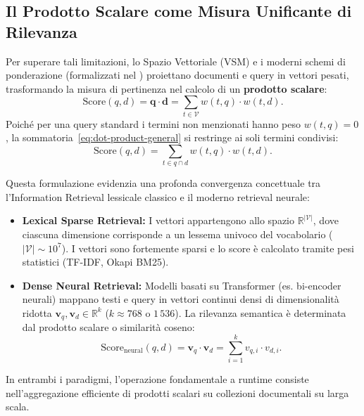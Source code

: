 \FloatBarrier
\subsection{Il Prodotto Scalare come Misura Unificante di Rilevanza}
\label{subsec:dot-product-misura-unificante}
Per superare tali limitazioni, lo Spazio Vettoriale (VSM) e i moderni schemi di ponderazione (formalizzati nel ) proiettano documenti e query in vettori pesati, trasformando la misura di pertinenza nel calcolo di un \textbf{prodotto scalare}:
\begin{equation}
\text{Score}(q, d) = \mathbf{q} \cdot \mathbf{d} = \sum_{t \in \mathcal{V}} w(t, q) \cdot w(t, d).
\label{eq:dot-product-general}
\end{equation}
Poich\'e per una query standard i termini non menzionati hanno peso $w(t, q) = 0$, la sommatoria~\eqref{eq:dot-product-general} si restringe ai soli termini condivisi:
\begin{equation}
\text{Score}(q, d) = \sum_{t \in q \cap d} w(t, q) \cdot w(t, d).
\label{eq:dot-product-intersection}
\end{equation}

Questa formulazione evidenzia una profonda convergenza concettuale tra l'Information Retrieval lessicale classico e il moderno retrieval neurale:
\begin{itemize}
    \item \textbf{Lexical Sparse Retrieval:} I vettori appartengono allo spazio $\mathbb{R}^{|\mathcal{V}|}$, dove ciascuna dimensione corrisponde a un lessema univoco del vocabolario ($|\mathcal{V}| \sim 10^7$). I vettori sono fortemente sparsi e lo score \`e calcolato tramite pesi statistici (TF-IDF, Okapi BM25).
    \item \textbf{Dense Neural Retrieval:} Modelli basati su Transformer (es. bi-encoder neurali) mappano testi e query in vettori continui densi di dimensionalit\`a ridotta $\mathbf{v}_q, \mathbf{v}_d \in \mathbb{R}^k$ ($k \approx 768 \text{ o } 1\,536$). La rilevanza semantica \`e determinata dal prodotto scalare o similarit\`a coseno:
    \begin{equation}
    \text{Score}_{\text{neural}}(q, d) = \mathbf{v}_q \cdot \mathbf{v}_d = \sum_{i=1}^{k} v_{q,i} \cdot v_{d,i}.
    \end{equation}
\end{itemize}
In entrambi i paradigmi, l'operazione fondamentale a runtime consiste nell'aggregazione efficiente di prodotti scalari su collezioni documentali su larga scala.

